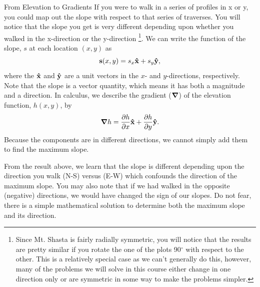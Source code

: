 \begin{activity}{From Elevation to Gradients}
If you were to walk in a series of profiles in x or y, you could map out the slope with respect to that series of traverses.  You will notice that the slope you get is very different depending upon whether you walked in the x-direction or the y-direction
\footnote{Since Mt. Shasta is fairly radially symmetric, you will notice that the results are pretty similar if you rotate the one of the plots 90$^\circ$ with respect to the other.  This is a relatively special case as we can't generally do this, however, many of the problems we will solve in this course either change in one direction only or are symmetric in some way to make the problems simpler.}.  We can write the function of the slope, $s$ at each location $(x,y)$ as
\begin{equation}
    \vb{s}(x,y) = s_x \vu{x} + s_y \vu{y},
\end{equation}
where the $\vu{x}$ and $\vu{y}$ are a unit vectors in the $x$- and $y$-directions, respectively.  Note that the slope is a vector quantity, which means it has both a magnitude and a direction.  In calculus, we describe the gradient ($\grad$) of the elevation function, $h(x,y)$, by
\begin{equation}
    \grad{h} = \pdv{h}{x} \vu{x} + \pdv{h}{y} \vu{y} .
\end{equation}
Because the components are in different directions, we cannot simply add them to find the maximum slope.

From the result above, we learn that the slope is different depending upon the direction you walk (N-S) versus (E-W) which confounds the direction of the maximum slope.  You may also note that if we had walked in the opposite (negative) directions, we would have changed the sign of our slopes.  Do not fear, there is a simple mathematical solution to determine both the maximum slope and its direction.


\end{activity}
